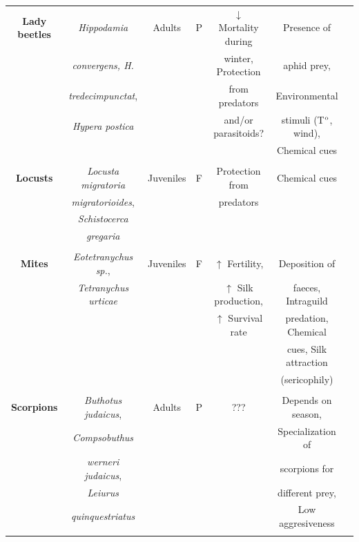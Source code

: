 \begin{landscape}
\begin{table}
	
	\label{tab:mixedsp3}
	\centering
	\begin{tabular*}{\linewidth}{@{\extracolsep{\fill}}ccccccc}
          \textbf{Lady beetles}	&\textit{Hippodamia}	&Adults	&P	& $\downarrow$ Mortality during	&Presence of	&\citep{simpson_aggregations_1975,lee_aggregation_1980,copp_temperature-dependent_1983,honek_aggregation_2007}\\ 
          &\textit{convergens, H.}	&	&	&winter, Protection 	&aphid prey,	&\\
          &\textit{tredecimpunctat},	&	&	&from predators	&Environmental	&\\
          &\textit{Hypera postica}	&	&	&and/or parasitoids?	&stimuli (T$\textsuperscript{o}$, wind),	&\\
          &	&	&	&	&Chemical cues	&\\
          &	&	&	&	&	&\\
          
          \textbf{Locusts}	&\textit{Locusta migratoria}	&Juveniles	&F	&Protection from	&Chemical cues	&\citep{uvarov_grasshoppers_1977,niassy_intra-_1999}\\
          &\textit{migratorioides},	&	&	&predators	&	&\\
          &\textit{Schistocerca}	&	&	&	&	&\\
          &\textit{gregaria}	&	&	&	&	&\\
          &	&	&	&	&	&\\
          
          \textbf{Mites}	&\textit{Eotetranychus sp.},	&Juveniles	&F	&$\uparrow$ Fertility, 	&Deposition of	&\citep{slone_spatial_1999,le_goff_benefits_2011}\\
          &\textit{Tetranychus urticae}	&	&	&$\uparrow$ Silk production,	&faeces, Intraguild	&\\
          &	&	&	&$\uparrow$ Survival rate	&predation, Chemical	&\\
          &	&	&	&	&cues, Silk attraction	&\\
          &	&	&	&	&(sericophily)	&\\
          &	&	&	&	&	&\\
          
          \textbf{Scorpions}	&\textit{Buthotus judaicus},	&Adults	&P	&???	&Depends on season,	&\cite{warburg_intra-_2000}\\
          &\textit{Compsobuthus}	&	&	&	&Specialization of	&\\ 
          &\textit{werneri judaicus},	&	&	&	&scorpions for	&\\
          &\textit{Leiurus}	&	&	&	&different prey,	&\\
          &\textit{quinquestriatus}	&	&	&	&Low aggresiveness	&\\
          &	&	&	&	&	&\\
          

\end{tabular*}
\end{table}
\end{landscape}
